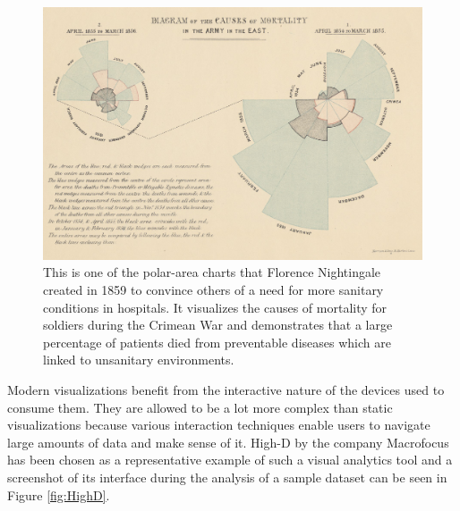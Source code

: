 \begin{figure}[tp]
\centering
\includegraphics[keepaspectratio,width=\linewidth,height=\fullh / 3]{images/nightingale.png}
\caption[Polar-Area Chart by Florence Nightingale From 1859]{
  This is one of the polar-area charts that Florence Nightingale created in 1859 to convince others of a need for more sanitary conditions in hospitals.
  It visualizes the causes of mortality for soldiers during the Crimean War and demonstrates that a large percentage of patients died from preventable diseases which are linked to unsanitary environments.
}
\label{fig:NightingalePolarAreaChart}
\end{figure}

Modern visualizations benefit from the interactive nature of the devices used to consume them.
They are allowed to be a lot more complex than static visualizations because various interaction techniques enable users to navigate large amounts of data and make sense of it.
High-D by the company Macrofocus \parencite{HighD} has been chosen as a representative example of such a visual analytics tool and a screenshot of its interface during the analysis of a sample dataset can be seen in Figure \ref{fig:HighD}.

